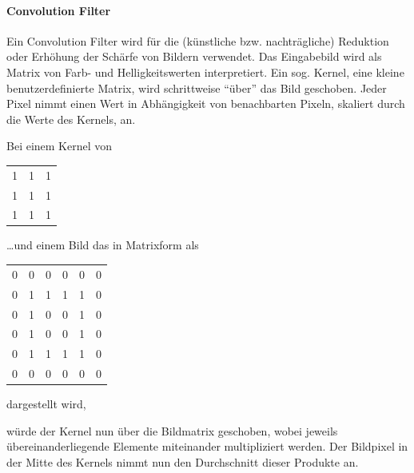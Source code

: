 \documentclass{article}
\begin{document}
\paragraph{Convolution Filter}

Ein Convolution Filter wird für die (künstliche bzw. nachträgliche) Reduktion oder Erhöhung der Schärfe von Bildern verwendet. Das Eingabebild wird als Matrix von Farb- und Helligkeitswerten interpretiert. Ein sog. Kernel, eine kleine benutzerdefinierte Matrix, wird schrittweise \enquote{über} das Bild geschoben. Jeder Pixel nimmt einen Wert in Abhängigkeit von benachbarten Pixeln, skaliert durch die Werte des Kernels, an.

\begin{minipage}[t]{.45\textwidth}
    Bei einem Kernel von
    \vspace{.5em}
    \begin{center}
        \begin{tabular}{c c c}
            1 & 1 & 1 \\
            1 & 1 & 1 \\
            1 & 1 & 1 \\
        \end{tabular}
    \end{center}
\end{minipage}\hfill
\begin{minipage}[t]{.45\textwidth}
    \ldots und einem Bild das in Matrixform als
    \vspace{.5em}
    \begin{center}
        \begin{tabular}{c c c c c c}
            0 & 0 & 0 & 0 & 0 & 0 \\
            0 & 1 & 1 & 1 & 1 & 0 \\
            0 & 1 & 0 & 0 & 1 & 0 \\
            0 & 1 & 0 & 0 & 1 & 0 \\
            0 & 1 & 1 & 1 & 1 & 0 \\
            0 & 0 & 0 & 0 & 0 & 0 \\
        \end{tabular}
    \end{center}
    \vspace{.5em}
    dargestellt wird,
\end{minipage}

w\"urde der Kernel nun \"uber die Bildmatrix geschoben, wobei jeweils \"ubereinanderliegende Elemente miteinander multipliziert werden. Der Bildpixel in der Mitte des Kernels nimmt nun den Durchschnitt dieser Produkte an.
\end{document}
